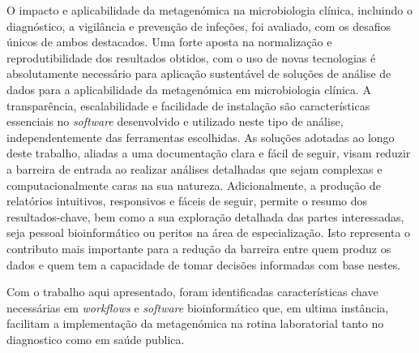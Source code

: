 O impacto e aplicabilidade da metagenómica na microbiologia clínica, incluindo o diagnóstico, a vigilância e prevenção de infeções, foi avaliado, com os desafios únicos de ambos destacados. Uma forte aposta na normalização e reprodutibilidade dos resultados obtidos, com o uso de novas tecnologias é absolutamente necessário para aplicação sustentável de soluções de análise de dados para a aplicabilidade da metagenómica em microbiologia clínica. A transparência, escalabilidade e facilidade de instalação são características essenciais no \textit{software} desenvolvido e utilizado neste tipo de análise, independentemente das ferramentas escolhidas. As soluções adotadas ao longo deste trabalho, aliadas a uma documentação clara e fácil de seguir, visam reduzir a barreira de entrada ao realizar análises detalhadas que sejam complexas e computacionalmente caras na sua natureza. Adicionalmente, a produção de relatórios intuitivos, responsivos e fáceis de seguir, permite o resumo dos resultados-chave, bem como a sua exploração detalhada das partes interessadas, seja pessoal bioinformático ou peritos na área de especialização. Isto representa o contributo mais importante para a redução da barreira entre quem produz os dados e quem tem a capacidade de tomar decisões informadas com base nestes. 

Com o trabalho aqui apresentado, foram identificadas características chave necessárias em \textit{workflows} e \textit{software} bioinformático que, em ultima instância, facilitam a implementação da metagenómica na rotina laboratorial tanto no diagnostico como em saúde publica.
